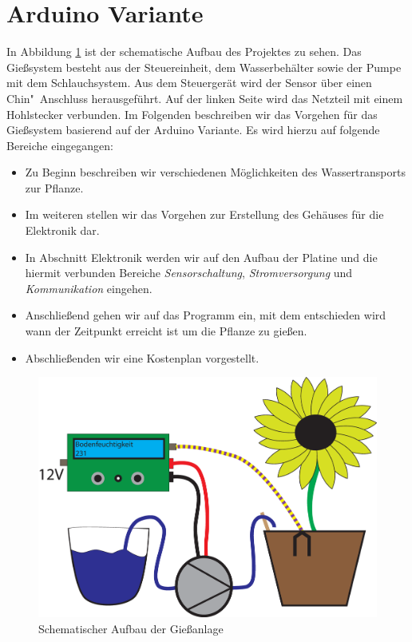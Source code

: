 \section{Arduino Variante}

In Abbildung \ref{fig-SchemaAufbau} ist der schematische Aufbau des Projektes zu sehen. Das Gießsystem besteht aus der Steuereinheit, dem Wasserbehälter sowie der Pumpe mit dem Schlauchsystem. Aus dem Steuergerät wird der Sensor über einen Chin"~Anschluss herausgeführt. Auf der linken Seite wird das Netzteil mit einem Hohlstecker verbunden. 
Im Folgenden beschreiben wir das Vorgehen für das Gießsystem basierend auf der Arduino Variante. 
Es wird hierzu auf folgende Bereiche eingegangen:

\begin{itemize}
	\item Zu Beginn beschreiben wir verschiedenen Möglichkeiten des Wassertransports zur Pflanze.
	\item Im weiteren stellen wir das Vorgehen zur Erstellung des Gehäuses für die Elektronik dar.
	\item In Abschnitt Elektronik werden wir auf den Aufbau der Platine und die hiermit verbunden Bereiche \emph{Sensorschaltung}, \emph{Stromversorgung} und \emph{Kommunikation} eingehen.
	\item Anschließend gehen wir auf das Programm ein, mit dem entschieden wird wann der Zeitpunkt erreicht ist um die Pflanze zu gießen.
	\item Abschließenden wir eine Kostenplan vorgestellt. 
	
\end{itemize}

	\begin{figure}[ht]
	\centering
	\includegraphics[width=0.9\linewidth]{bilder/Bild_Aufbau.eps}	
	\caption{Schematischer Aufbau der Gießanlage}
	\label{fig-SchemaAufbau}
	\end{figure}

